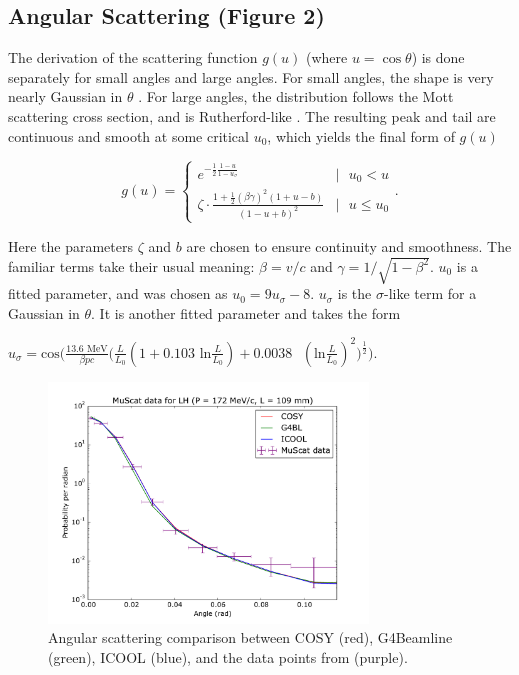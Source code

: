 \documentclass{jacow}
\begin{document}
\subsection{Angular Scattering (Figure 2)}
The derivation of the scattering function $g(u)$ (where  $u = \cos\theta$) is done separately for small angles and large angles. For small angles, the shape is very nearly Gaussian in $\theta$ \cite{GS}. For large angles, the distribution follows the Mott scattering cross section, and is Rutherford-like \cite{Mott}. The resulting peak and tail are continuous and smooth at some critical $u_0$, which yields the final form of $g(u)$ \begin{center} \[g(u) = \left\{
  \begin{array}{lr}
    e^{-\frac{1}{2}\frac{1-u}{1-u_\sigma}} & |\text{ } u_0 < u\\
    \zeta\cdot\frac{1+\frac{1}{2}(\beta\gamma)^2(1+u-b)}{(1-u+b)^2} & | \text{ } u \le u_0
  \end{array} .
\right.
\] \end{center}
Here the parameters $\zeta$ and $b$ are chosen to ensure continuity and smoothness. The familiar terms take their usual meaning: $\beta=v/c$ and $\gamma=1/\sqrt{1-\beta^2}$. $u_0$ is a fitted parameter, and was chosen as $u_0=9u_\sigma-8$. $u_\sigma$ is the $\sigma$-like term for a Gaussian in $\theta$. It is another fitted parameter and takes the form\\ \begin{center}
$u_\sigma=\text{cos}\Big(\frac{13.6 \text{ MeV}}{\beta pc}\Big(\frac{L}{L_0}(1+0.103\text{ ln}\frac{L}{L_0})+0.0038\text{ }(\text{ln}\frac{L}{L_0})^2\Big)^\frac{1}{2}\Big)\text{.}$ \end{center}

\begin{figure}[h!]
\centering
\includegraphics*[width=85mm]{Figures/figure2.pdf}
\caption{Angular scattering comparison between COSY (red), G4Beamline (green), ICOOL (blue), and the data points from \cite{Muscat} (purple).}
\end{figure}
\end{document}
